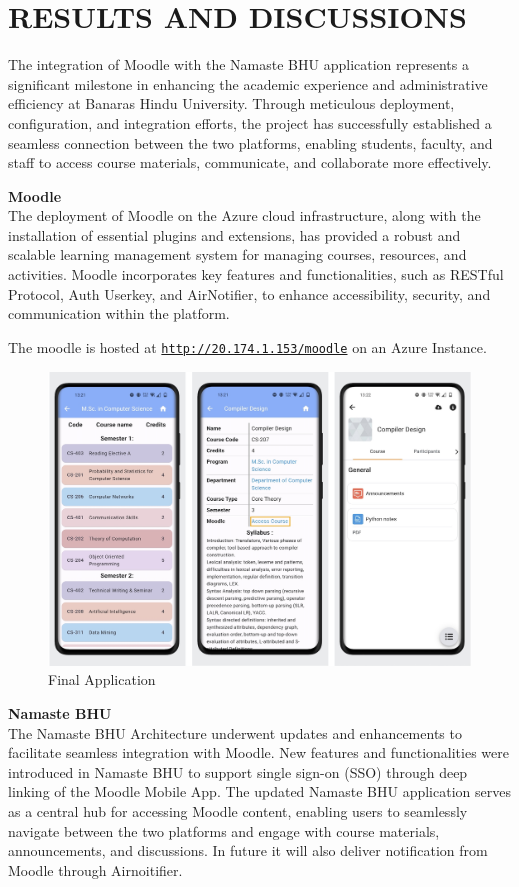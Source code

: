 \clearpage
\chapter{RESULTS AND DISCUSSIONS}

The integration of Moodle with the Namaste BHU application represents a significant milestone in enhancing the academic experience and administrative efficiency at Banaras Hindu University. Through meticulous deployment, configuration, and integration efforts, the project has successfully established a seamless connection between the two platforms, enabling students, faculty, and staff to access course materials, communicate, and collaborate more effectively.

\textbf{Moodle}\\
The deployment of Moodle on the Azure cloud infrastructure, along with the installation of essential plugins and extensions, has provided a robust and scalable learning management system for managing courses, resources, and activities. Moodle incorporates key features and functionalities, such as RESTful Protocol, Auth Userkey, and AirNotifier, to enhance accessibility, security, and communication within the platform.

The moodle is hosted at \href{http://20.174.1.153/moodle}{\texttt{http://20.174.1.153/moodle}} on an Azure Instance.

\begin{figure}[h]
    \centering
    \includegraphics[width=\linewidth]{assets/img/result-opt.jpg}
    \caption{Final Application}
    \label{fig:result}
\end{figure}

\textbf{Namaste BHU}\\
The Namaste BHU Architecture underwent updates and enhancements to facilitate seamless integration with Moodle. New features and functionalities were introduced in Namaste BHU to support single sign-on (SSO) through deep linking of the Moodle Mobile App. The updated Namaste BHU application serves as a central hub for accessing Moodle content, enabling users to seamlessly navigate between the two platforms and engage with course materials, announcements, and discussions. In future it will also deliver notification from Moodle through Airnoitifier.

